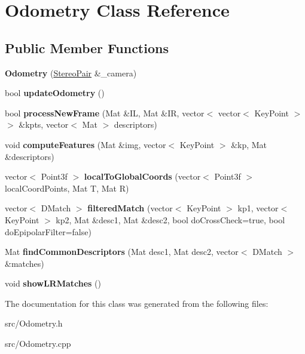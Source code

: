 \hypertarget{class_odometry}{}\section{Odometry Class Reference}
\label{class_odometry}
\subsection*{Public Member Functions}
\begin{DoxyCompactItemize}
\item 
{\bfseries Odometry} (\hyperlink{class_stereo_pair}{Stereo\+Pair} \&\+\_\+camera)\hypertarget{class_odometry_a9d4581634044bd5c531fea9d7acbd257}{}\label{class_odometry_a9d4581634044bd5c531fea9d7acbd257}

\item 
bool {\bfseries update\+Odometry} ()\hypertarget{class_odometry_a938005b853ba6b5d569afe84f8c64cb0}{}\label{class_odometry_a938005b853ba6b5d569afe84f8c64cb0}

\item 
bool {\bfseries process\+New\+Frame} (Mat \&IL, Mat \&IR, vector$<$ vector$<$ Key\+Point $>$ $>$ \&kpts, vector$<$ Mat $>$ descriptors)\hypertarget{class_odometry_a93c6c62649731f05bf87c0432cc9010e}{}\label{class_odometry_a93c6c62649731f05bf87c0432cc9010e}

\item 
void {\bfseries compute\+Features} (Mat \&img, vector$<$ Key\+Point $>$ \&kp, Mat \&descriptors)\hypertarget{class_odometry_aa5dc6005b379454d5b1392724b3d4365}{}\label{class_odometry_aa5dc6005b379454d5b1392724b3d4365}

\item 
vector$<$ Point3f $>$ {\bfseries local\+To\+Global\+Coords} (vector$<$ Point3f $>$ local\+Coord\+Points, Mat T, Mat R)\hypertarget{class_odometry_a2f41c3852c1ee20e094a843870f8661f}{}\label{class_odometry_a2f41c3852c1ee20e094a843870f8661f}

\item 
vector$<$ D\+Match $>$ {\bfseries filtered\+Match} (vector$<$ Key\+Point $>$ kp1, vector$<$ Key\+Point $>$ kp2, Mat \&desc1, Mat \&desc2, bool do\+Cross\+Check=true, bool do\+Epipolar\+Filter=false)\hypertarget{class_odometry_aaaaea0a8361f845ca232e4c7bd8dd4ed}{}\label{class_odometry_aaaaea0a8361f845ca232e4c7bd8dd4ed}

\item 
Mat {\bfseries find\+Common\+Descriptors} (Mat desc1, Mat desc2, vector$<$ D\+Match $>$ \&matches)\hypertarget{class_odometry_af205c958c28548fdf40cb64b2d592690}{}\label{class_odometry_af205c958c28548fdf40cb64b2d592690}

\item 
void {\bfseries show\+L\+R\+Matches} ()\hypertarget{class_odometry_a64b00caa2807961959d73811e7ab77d0}{}\label{class_odometry_a64b00caa2807961959d73811e7ab77d0}

\end{DoxyCompactItemize}


The documentation for this class was generated from the following files\+:\begin{DoxyCompactItemize}
\item 
src/Odometry.\+h\item 
src/Odometry.\+cpp\end{DoxyCompactItemize}
